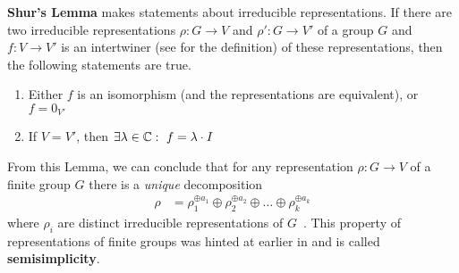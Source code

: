 \textbf{Shur's Lemma} makes statements about irreducible representations.
If there are two irreducible representations $\rho: G \to V$ and $\rho': G \to V'$ of a group $G$ and $f: V \to V'$ is an intertwiner (see  for the definition) of these representations, then the following statements are true.
\begin{enumerate}
    \item Either $f$ is an isomorphism (and the representations are equivalent), or $f = 0_{V'}$
    \item If $V = V'$, then $\exists \lambda \in \mathbb{C}:\ f = \lambda \cdot I$
\end{enumerate}
From this Lemma, we can conclude that for any representation $\rho: G \to V$ of a finite group $G$ there is a \textit{unique} decomposition
\begin{align}
    \rho & = \rho_1^{\oplus a_1} \oplus \rho_2^{\oplus a_2} \oplus \ldots \oplus \rho_k^{\oplus a_k} 
\end{align}
where $\rho_i$ are distinct irreducible representations of $G$~\cite{fulton2013}.
This property of representations of finite groups was hinted at earlier in  and is called \textbf{semisimplicity}.
